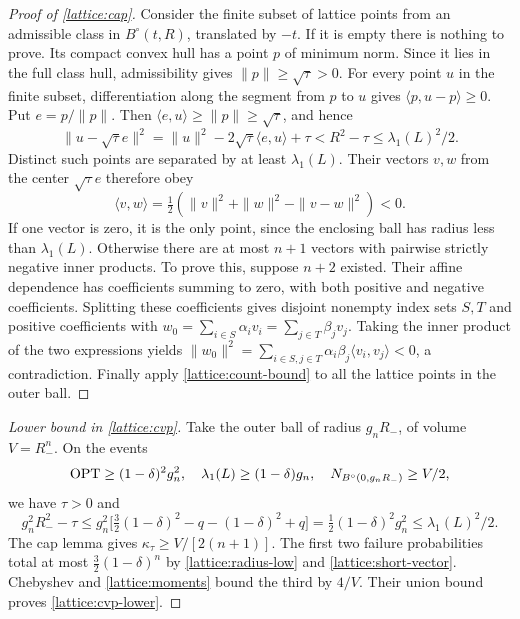 \begin{proof}[Proof of \cref{lattice:cap}]
Consider the finite subset of lattice points from an admissible class in
$B^\circ(t,R)$, translated by $-t$. If it is empty there is nothing to
prove. Its compact convex hull has a point $p$ of minimum norm. Since it
lies in the full class hull, admissibility gives $\|p\|\ge\sqrt\tau>0$.
For every point $u$ in the finite subset, differentiation along the
segment from $p$ to $u$ gives
$\langle p,u-p\rangle\ge0$. Put $e=p/\|p\|$. Then
$\langle e,u\rangle\ge\|p\|\ge\sqrt\tau$, and hence
\begin{equation*}
 \|u-\sqrt\tau e\|^2
 =\|u\|^2-2\sqrt\tau\langle e,u\rangle+\tau
 <R^2-\tau\le\lambda_1(L)^2/2.
\end{equation*}
Distinct such points are separated by at least $\lambda_1(L)$. Their
vectors $v,w$ from the center $\sqrt\tau e$ therefore obey
\begin{equation*}
 \langle v,w\rangle
 =\tfrac12(\|v\|^2+\|w\|^2-\|v-w\|^2)<0.
\end{equation*}
If one vector is zero, it is the only point, since the enclosing ball has
radius less than $\lambda_1(L)$. Otherwise there are at most $n+1$
vectors with pairwise strictly negative inner products. To prove this,
suppose $n+2$ existed. Their affine dependence has coefficients summing
to zero, with both positive and negative coefficients. Splitting these
coefficients gives disjoint nonempty index sets $S,T$ and positive
coefficients with
$w_0=\sum_{i\in S}\alpha_i v_i=\sum_{j\in T}\beta_jv_j$.
Taking the inner product of the two expressions yields
$\|w_0\|^2=\sum_{i\in S,j\in T}\alpha_i\beta_j
\langle v_i,v_j\rangle<0$, a contradiction. Finally apply
\eqref{lattice:count-bound} to all the lattice points in the outer ball.
\end{proof}

\begin{proof}[Lower bound in \cref{lattice:cvp}]
Take the outer ball of radius $g_nR_-$, of volume $V=R_-^n$. On the events
\begin{equation*}
 \operatorname{OPT}\ge(1-\delta)^2g_n^2,
 \quad\lambda_1(L)\ge(1-\delta)g_n,
 \quad N_{B^\circ(0,g_nR_-)}\ge V/2,
\end{equation*}
we have $\tau>0$ and
\begin{equation*}
 g_n^2R_-^2-\tau
 \le g_n^2\bigl[\tfrac32(1-\delta)^2-q
                     -(1-\delta)^2+q\bigr]
 =\tfrac12(1-\delta)^2g_n^2\le\lambda_1(L)^2/2.
\end{equation*}
The cap lemma gives $\kappa_\tau\ge V/[2(n+1)]$. The first two failure
probabilities total at most $\tfrac32(1-\delta)^n$ by
\eqref{lattice:radius-low} and \eqref{lattice:short-vector}. Chebyshev and
\eqref{lattice:moments} bound the third by $4/V$. Their union bound proves
\eqref{lattice:cvp-lower}.
\end{proof}

